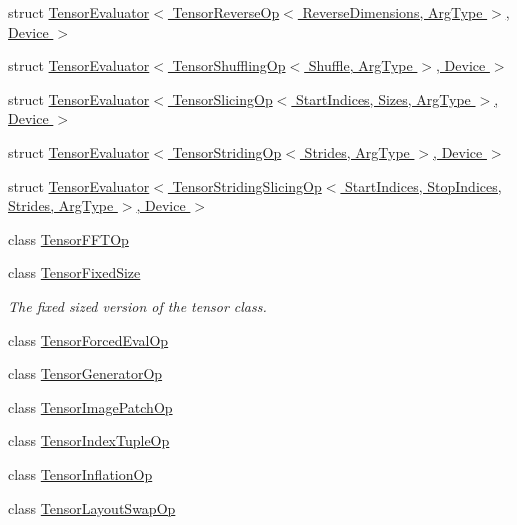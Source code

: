 \begin{DoxyCompactItemize}
\item 
struct \hyperlink{struct_eigen_1_1_tensor_evaluator_3_01_tensor_reverse_op_3_01_reverse_dimensions_00_01_arg_type_01_4_00_01_device_01_4}{Tensor\+Evaluator$<$ Tensor\+Reverse\+Op$<$ Reverse\+Dimensions, Arg\+Type $>$, Device $>$}
\item 
struct \hyperlink{struct_eigen_1_1_tensor_evaluator_3_01_tensor_shuffling_op_3_01_shuffle_00_01_arg_type_01_4_00_01_device_01_4}{Tensor\+Evaluator$<$ Tensor\+Shuffling\+Op$<$ Shuffle, Arg\+Type $>$, Device $>$}
\item 
struct \hyperlink{struct_eigen_1_1_tensor_evaluator_3_01_tensor_slicing_op_3_01_start_indices_00_01_sizes_00_01_arg_type_01_4_00_01_device_01_4}{Tensor\+Evaluator$<$ Tensor\+Slicing\+Op$<$ Start\+Indices, Sizes, Arg\+Type $>$, Device $>$}
\item 
struct \hyperlink{struct_eigen_1_1_tensor_evaluator_3_01_tensor_striding_op_3_01_strides_00_01_arg_type_01_4_00_01_device_01_4}{Tensor\+Evaluator$<$ Tensor\+Striding\+Op$<$ Strides, Arg\+Type $>$, Device $>$}
\item 
struct \hyperlink{struct_eigen_1_1_tensor_evaluator_3_01_tensor_striding_slicing_op_3_01_start_indices_00_01_stop_b19fd6c14958f7e749ce3c389a8eda72}{Tensor\+Evaluator$<$ Tensor\+Striding\+Slicing\+Op$<$ Start\+Indices, Stop\+Indices, Strides, Arg\+Type $>$, Device $>$}
\item 
class \hyperlink{class_eigen_1_1_tensor_f_f_t_op}{Tensor\+F\+F\+T\+Op}
\item 
class \hyperlink{class_eigen_1_1_tensor_fixed_size}{Tensor\+Fixed\+Size}
\begin{DoxyCompactList}\small\item\em The fixed sized version of the tensor class. \end{DoxyCompactList}\item 
class \hyperlink{class_eigen_1_1_tensor_forced_eval_op}{Tensor\+Forced\+Eval\+Op}
\item 
class \hyperlink{class_eigen_1_1_tensor_generator_op}{Tensor\+Generator\+Op}
\item 
class \hyperlink{class_eigen_1_1_tensor_image_patch_op}{Tensor\+Image\+Patch\+Op}
\item 
class \hyperlink{class_eigen_1_1_tensor_index_tuple_op}{Tensor\+Index\+Tuple\+Op}
\item 
class \hyperlink{class_eigen_1_1_tensor_inflation_op}{Tensor\+Inflation\+Op}
\item 
class \hyperlink{class_eigen_1_1_tensor_layout_swap_op}{Tensor\+Layout\+Swap\+Op}

\end{DoxyCompactItemize}
